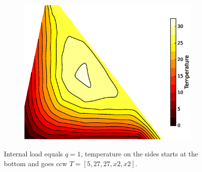 \documentclass[10pt, a4paper]{article}
\begin{document}
\begin{figure}[H]
\begin{subfigure}[H]{0.33\textwidth}
		\caption{}
		\label{fig:2}
	\end{subfigure}
	\begin{subfigure}[H]{0.33\textwidth}
		\includegraphics[width=\textwidth]{fig/exdam1_3.eps}
		\caption{}
		\label{fig:3}
	\end{subfigure}
	\caption{Internal load equals $q=1$, temperature on the sides starts at the bottom and goes ccw $T=[5, 27, 27, x2, x2]$.}
	\label{fig:3_1}
\end{figure}
\end{document}
